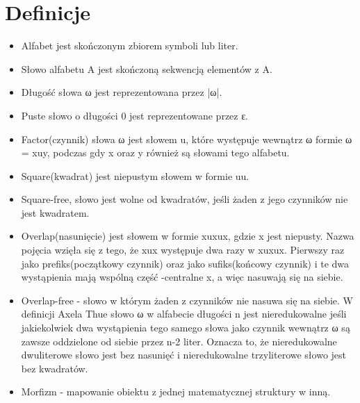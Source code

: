 \documentclass[document]{xmgr}
\begin{document}
\section{Definicje}
\begin{itemize}
\item Alfabet jest skończonym zbiorem symboli lub liter.
\item Słowo alfabetu A jest skończoną sekwencją elementów z A. 
\item Długość słowa ω jest reprezentowana przez |ω|.
\item Puste słowo o długości 0 jest reprezentowane przez ε.
\item Factor(czynnik) słowa ω jest słowem u, które występuje wewnątrz ω formie ω = xuy, podczas gdy x oraz y również są słowami tego alfabetu.
\item Square(kwadrat) jest niepustym słowem w formie uu.
\item Square-free, słowo jest wolne od kwadratów, jeśli żaden z jego czynników nie jest kwadratem.
\item Overlap(nasunięcie) jest słowem w formie xuxux, gdzie x jest niepusty. Nazwa pojęcia wzięła się z tego, że xux występuje dwa razy w xuxux. Pierwszy raz jako prefiks(początkowy czynnik) oraz jako sufiks(końcowy czynnik) i te dwa wystąpienia mają wspólną część -centralne x, a więc nasuwają się na siebie.
\item Overlap-free - słowo w którym żaden z czynników nie nasuwa się na siebie.
W definicji Axela Thue słowo ω w alfabecie długości n jest nieredukowalne jeśli jakiekolwiek dwa wystąpienia tego samego słowa jako czynnik wewnątrz ω są zawsze oddzielone od siebie przez n-2 liter. Oznacza to, że nieredukowalne dwuliterowe słowo jest bez nasunięć i nieredukowalne trzyliterowe słowo jest bez kwadratów.
\item Morfizm - mapowanie obiektu z jednej matematycznej struktury w inną.
\end{itemize}
\end{document}
